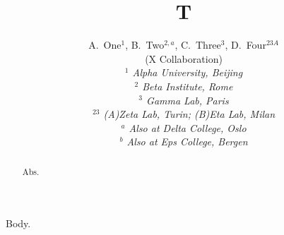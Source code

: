 \documentclass[aps,prd,superscriptaddress]{revtex4-1}
\begin{document}
\title{T}
\author{
		\begin{center}
	A.~One$^{1}$, B.~Two$^{2,a}$, C.~Three$^{3}$, D.~Four$^{23A}$
	\\
		\vspace{0.2cm}
		(X Collaboration)\\
		\vspace{0.2cm} {\it
	$^{1}$ Alpha University, Beijing\\$^{2}$ Beta Institute, Rome\\$^{3}$ Gamma Lab, Paris\\$^{23}$ (A)Zeta Lab, Turin; (B)Eta Lab, Milan\\
		\vspace{0.2cm}
		$^{a}$ Also at Delta College, Oslo\\$^{b}$ Also at Eps College, Bergen\\
		}\end{center}
		\vspace{0.4cm}
}
\begin{abstract}Abs.\end{abstract}
\maketitle
Body.
\end{document}
